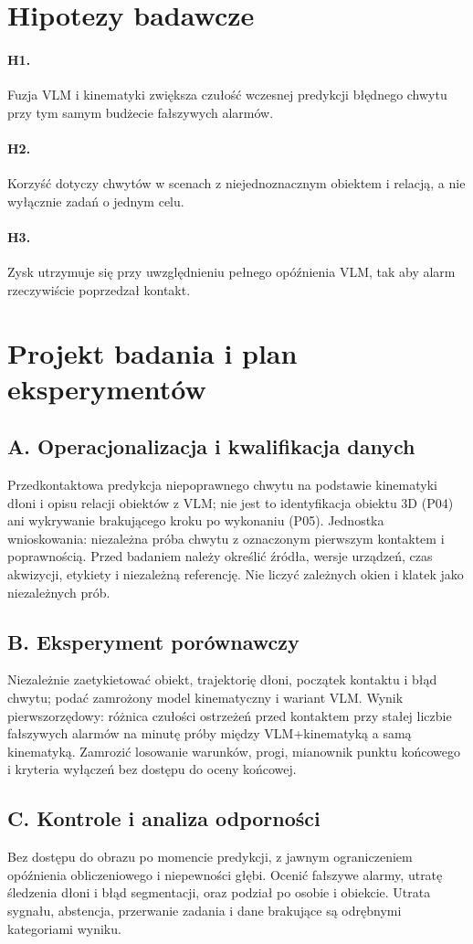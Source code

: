 \documentclass[11pt,a4paper]{article}
\begin{document}
\section{Hipotezy badawcze}
\paragraph{H1.} Fuzja VLM i kinematyki zwiększa czułość wczesnej predykcji błędnego chwytu przy tym samym budżecie fałszywych alarmów.
\paragraph{H2.} Korzyść dotyczy chwytów w scenach z niejednoznacznym obiektem i relacją, a nie wyłącznie zadań o jednym celu.
\paragraph{H3.} Zysk utrzymuje się przy uwzględnieniu pełnego opóźnienia VLM, tak aby alarm rzeczywiście poprzedzał kontakt.
\section{Projekt badania i plan eksperymentów}
\subsection{A. Operacjonalizacja i kwalifikacja danych}
Przedkontaktowa predykcja niepoprawnego chwytu na podstawie kinematyki dłoni i opisu relacji obiektów z VLM; nie jest to identyfikacja obiektu 3D (P04) ani wykrywanie brakującego kroku po wykonaniu (P05). Jednostka wnioskowania: niezależna próba chwytu z oznaczonym pierwszym kontaktem i poprawnością. Przed badaniem należy określić źródła, wersje urządzeń, czas akwizycji, etykiety i niezależną referencję. Nie liczyć zależnych okien i klatek jako niezależnych prób.
\subsection{B. Eksperyment porównawczy}
Niezależnie zaetykietować obiekt, trajektorię dłoni, początek kontaktu i błąd chwytu; podać zamrożony model kinematyczny i wariant VLM. Wynik pierwszorzędowy: różnica czułości ostrzeżeń przed kontaktem przy stałej liczbie fałszywych alarmów na minutę próby między VLM+kinematyką a samą kinematyką. Zamrozić losowanie warunków, progi, mianownik punktu końcowego i kryteria wyłączeń bez dostępu do oceny końcowej.
\subsection{C. Kontrole i analiza odporności}
Bez dostępu do obrazu po momencie predykcji, z jawnym ograniczeniem opóźnienia obliczeniowego i niepewności głębi. Ocenić fałszywe alarmy, utratę śledzenia dłoni i błąd segmentacji, oraz podział po osobie i obiekcie. Utrata sygnału, abstencja, przerwanie zadania i dane brakujące są odrębnymi kategoriami wyniku.
\end{document}
